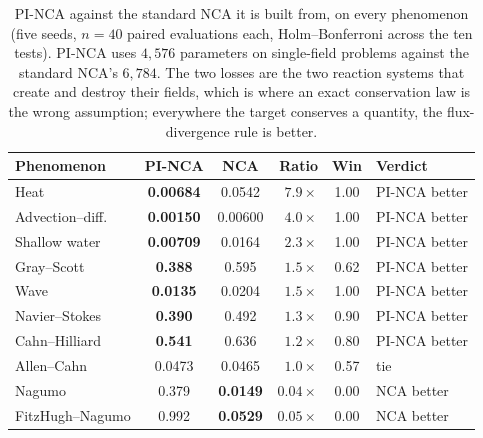 \begin{table}[t]
\centering
\caption{PI-NCA against the standard NCA it is built from, on every phenomenon (five
seeds, $n=40$ paired evaluations each, Holm--Bonferroni across the ten tests). PI-NCA
uses $4{,}576$ parameters on single-field problems against the standard NCA's
$6{,}784$. The two losses are the two reaction systems that create and destroy their
fields, which is where an exact conservation law is the wrong assumption; everywhere the
target conserves a quantity, the flux-divergence rule is better.}
\label{tab:vsnca}
\small
\begin{tabular}{lccrcl}
\toprule
Phenomenon & PI-NCA & NCA & Ratio & Win & Verdict \\
\midrule
Heat              & \textbf{0.00684} & 0.0542  & $7.9\times$  & 1.00 & PI-NCA better \\
Advection--diff.  & \textbf{0.00150} & 0.00600 & $4.0\times$  & 1.00 & PI-NCA better \\
Shallow water     & \textbf{0.00709} & 0.0164  & $2.3\times$  & 1.00 & PI-NCA better \\
Gray--Scott       & \textbf{0.388}   & 0.595   & $1.5\times$  & 0.62 & PI-NCA better \\
Wave              & \textbf{0.0135}  & 0.0204  & $1.5\times$  & 1.00 & PI-NCA better \\
Navier--Stokes    & \textbf{0.390}   & 0.492   & $1.3\times$  & 0.90 & PI-NCA better \\
Cahn--Hilliard    & \textbf{0.541}   & 0.636   & $1.2\times$  & 0.80 & PI-NCA better \\
Allen--Cahn       & 0.0473           & 0.0465  & $1.0\times$  & 0.57 & tie \\
Nagumo            & 0.379            & \textbf{0.0149}  & $0.04\times$ & 0.00 & NCA better \\
FitzHugh--Nagumo  & 0.992            & \textbf{0.0529}  & $0.05\times$ & 0.00 & NCA better \\
\bottomrule
\end{tabular}
\end{table}
